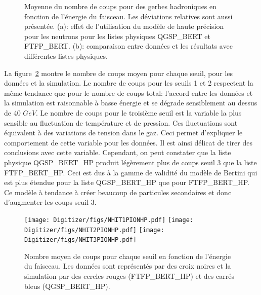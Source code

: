 \begin{figure}[!ht]
  \caption{Moyenne du nombre de coups pour des gerbes hadroniques en fonction de l'énergie du faisceau. Les déviations relatives sont aussi présentée. (a): effet de l'utilisation du modèle de haute précision pour les neutrons pour les listes physiques QGSP\_BERT et FTFP\_BERT. (b): comparaison entre données et les résultats avec différentes listes physiques.}
  \label{fig.nhit_pi-_ebeam_model}
\end{figure}

La figure~\ref{fig.pi-nhit_thr} montre le nombre de coups moyen pour chaque seuil, pour les données et la simulation. Le nombre de coups pour les seuils 1 et 2 respectent la même tendance que pour le nombre de coups total: l'accord entre les données et la simulation est raisonnable à basse énergie et se dégrade sensiblement au dessus de 40 $GeV$. Le nombre de coups pour le troisième seuil est la variable la plus sensible au fluctuation de température et de pression. Ces fluctuations sont équivalent à des  variations de tension dans le gaz. Ceci permet d'expliquer le comportement de cette variable pour les données. Il est ainsi délicat de tirer des conclusions avec cette variable. Cependant, on peut constater que la liste physique QGSP\_BERT\_HP produit légèrement plus de coups seuil 3 que la liste FTFP\_BERT\_HP. Ceci est dus à la gamme de validité du modèle de Bertini qui est plus étendue pour la liste QGSP\_BERT\_HP que pour FTFP\_BERT\_HP. Ce modèle à tendance à créer beaucoup de particules secondaires et donc d'augmenter les coups seuil 3.
\begin{figure}[!ht]
  \texttt{[image: Digitizer/figs/NHIT1PIONHP.pdf]}
  \texttt{[image: Digitizer/figs/NHIT2PIONHP.pdf]}
  \texttt{[image: Digitizer/figs/NHIT3PIONHP.pdf]}
  \caption{Nombre moyen de coups pour chaque seuil en fonction de l'énergie du faisceau. Les données sont représentés par des croix noires et la simulation par des cercles rouges (FTFP\_BERT\_HP) et des carrés bleus (QGSP\_BERT\_HP).\label{fig.pi-nhit_thr}}
\end{figure}


